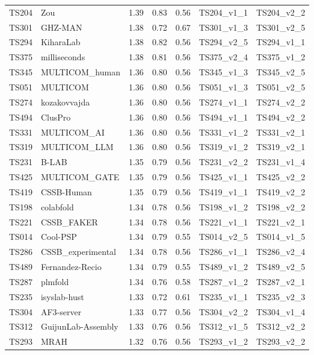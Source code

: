 \begin{table}[ht]
{\begin{tabular}{llrrrll}
TS204 & Zou & 1.39 & 0.83 & 0.56 & TS204\_v1\_1 & TS204\_v2\_2 \\ 
TS301 & GHZ-MAN & 1.38 & 0.72 & 0.67 & TS301\_v1\_3 & TS301\_v2\_5 \\ 
TS294 & KiharaLab & 1.38 & 0.82 & 0.56 & TS294\_v2\_5 & TS294\_v1\_1 \\ 
TS375 & milliseconds & 1.38 & 0.81 & 0.56 & TS375\_v2\_4 & TS375\_v1\_2 \\ 
TS345 & MULTICOM\_human & 1.36 & 0.80 & 0.56 & TS345\_v1\_3 & TS345\_v2\_5 \\ 
TS051 & MULTICOM & 1.36 & 0.80 & 0.56 & TS051\_v1\_3 & TS051\_v2\_5 \\ 
TS274 & kozakovvajda & 1.36 & 0.80 & 0.56 & TS274\_v1\_1 & TS274\_v2\_2 \\ 
TS494 & ClusPro & 1.36 & 0.80 & 0.56 & TS494\_v1\_1 & TS494\_v2\_2 \\ 
TS331 & MULTICOM\_AI & 1.36 & 0.80 & 0.56 & TS331\_v1\_2 & TS331\_v2\_1 \\ 
TS319 & MULTICOM\_LLM & 1.36 & 0.80 & 0.56 & TS319\_v1\_2 & TS319\_v2\_1 \\ 
TS231 & B-LAB & 1.35 & 0.79 & 0.56 & TS231\_v2\_2 & TS231\_v1\_4 \\ 
TS425 & MULTICOM\_GATE & 1.35 & 0.79 & 0.56 & TS425\_v1\_1 & TS425\_v2\_2 \\ 
TS419 & CSSB-Human & 1.35 & 0.79 & 0.56 & TS419\_v1\_1 & TS419\_v2\_2 \\ 
TS198 & colabfold & 1.34 & 0.78 & 0.56 & TS198\_v1\_2 & TS198\_v2\_2 \\ 
TS221 & CSSB\_FAKER & 1.34 & 0.78 & 0.56 & TS221\_v1\_1 & TS221\_v2\_1 \\ 
TS014 & Cool-PSP & 1.34 & 0.79 & 0.55 & TS014\_v2\_5 & TS014\_v1\_5 \\ 
TS286 & CSSB\_experimental & 1.34 & 0.78 & 0.56 & TS286\_v1\_1 & TS286\_v2\_4 \\ 
TS489 & Fernandez-Recio & 1.34 & 0.79 & 0.55 & TS489\_v1\_2 & TS489\_v2\_5 \\ 
TS287 & plmfold & 1.34 & 0.76 & 0.58 & TS287\_v1\_2 & TS287\_v2\_1 \\ 
TS235 & isyslab-hust & 1.33 & 0.72 & 0.61 & TS235\_v1\_1 & TS235\_v2\_3 \\ 
TS304 & AF3-server & 1.33 & 0.77 & 0.56 & TS304\_v2\_2 & TS304\_v1\_4 \\ 
TS312 & GuijunLab-Assembly & 1.33 & 0.76 & 0.56 & TS312\_v1\_5 & TS312\_v2\_2 \\ 
TS293 & MRAH & 1.32 & 0.76 & 0.56 & TS293\_v1\_2 & TS293\_v2\_2 \\ 

\end{tabular}}
\end{table}
